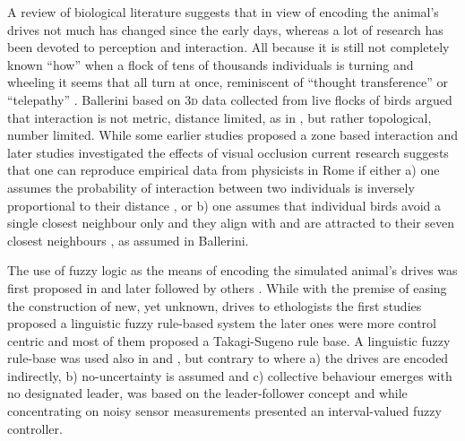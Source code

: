 A review of biological literature suggests that in view of encoding the animal's drives not much has changed since the early days, whereas a lot of research has been devoted to perception and interaction. All because it is still not completely known ``how'' when a flock of tens of thousands individuals is turning and wheeling it seems that all turn at once, reminiscent of ``thought transference'' or ``telepathy'' \cite{lebarbajec2009organized,hayes2011flights}. Ballerini\etal \cite{ballerini2008interaction} based on \textsc{3d} data collected from live flocks of birds argued that interaction is not metric, \ie distance limited, as in \cite{reynolds1987flocks}, but rather topological, \ie number limited. While some earlier studies proposed a zone based interaction \cite{couzin2002collective,couzin2005effective} and later studies investigated the effects of visual occlusion \cite{demsar2014simulated,kunz2012simulations,pearce2014role} current research suggests that one can reproduce empirical data from physicists in Rome \cite{ballerini2008interaction,cavagna2013diffusion} if either a) one assumes the probability of interaction between two individuals is inversely proportional to their distance \cite{bode2011limited}, or b) one assumes that individual birds avoid a single closest neighbour only and they align with and are attracted to their seven closest neighbours \cite{hemelrijk2015diffusion}, as assumed in Ballerini\etal \cite{ballerini2008interaction}.

The use of fuzzy logic as the means of encoding the simulated animal's drives was first proposed in \cite{lebarbajec2003boids,lebarbajec2003fuzzifying,lebarbajec2005fuzzy,lebarbajec2005simulating} and later followed by others \cite{dong2013fuzzy,gu2008using,lee2011design,sahu2013fuzzy,tron2004mathematical,wang2007behaviour,yu2010control,yu2010obstacle}. While with the premise of easing the construction of new, yet unknown, drives to ethologists the first studies proposed a linguistic fuzzy rule-based system the later ones were more control centric and most of them proposed a Takagi-Sugeno rule base. A linguistic fuzzy rule-base was used also in \cite{sahu2013fuzzy} and \cite{lee2011design}, but contrary to \cite{lebarbajec2005simulating} where a) the drives are encoded indirectly, b) no-uncertainty is assumed and c) collective behaviour emerges with no designated leader, \cite{sahu2013fuzzy} was based on the leader-follower concept and \cite{lee2011design} while concentrating on noisy sensor measurements presented an interval-valued fuzzy controller.

